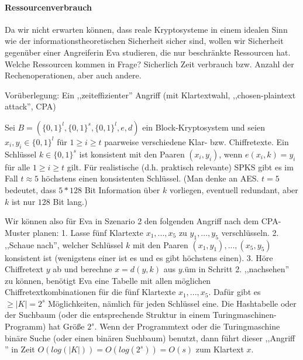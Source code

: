 \documentclass[a4paper]{article}
\begin{document}
\begin{multicols}{3}
    \paragraph{Ressourcenverbrauch}
    Da wir nicht erwarten können, dass reale Kryptosysteme in einem idealen Sinn wie der informationstheoretischen Sicherheit sicher sind, wollen wir Sicherheit gegenüber einer Angreiferin Eva studieren, die nur beschränkte Ressourcen hat. Welche Ressourcen kommen in Frage? Sicherlich Zeit verbrauch bzw. Anzahl der Rechenoperationen, aber auch andere.

    Vorüberlegung: Ein ,,zeiteffizienter'' Angriff (mit Klartextwahl, ,,chosen-plaintext attack'', CPA)

    Sei $B=(\{0,1\}^l,\{0,1\}^s,\{0,1\}^l,e,d)$ ein Block-Kryptosystem und seien $x_i,y_i\in\{0,1\}^l$ für $1\geq i\geq t$ paarweise verschiedene Klar- bzw. Chiffretexte. Ein Schlüssel $k\in\{0,1\}^s$ ist konsistent mit den Paaren $(x_i,y_i)$, wenn $e(x_i,k)=y_i$ für alle $1\geq i\geq t$ gilt. Für realistische (d.h. praktisch relevante) SPKS gibt es im Fall $t\approx 5$ höchstens einen konsistenten Schlüssel. (Man denke an AES. $t=5$ bedeutet, dass $5*128$ Bit Information über $k$ vorliegen, eventuell redundant, aber $k$ ist nur $128$ Bit lang.)

    Wir können also für Eva in Szenario 2 den folgenden Angriff nach dem CPA-Muster planen:
    1. Lasse fünf Klartexte $x_1,...,x_5$ zu $y_1,...,y_5$ verschlüsseln.
    2. ,,Schaue nach'', welcher Schlüssel $k$ mit den Paaren $(x_1,y_1),...,(x_5,y_5)$ konsistent ist (wenigstens einer ist es und es gibt höchstens einen).
    3. Höre Chiffretext $y$ ab und berechne $x=d(y,k)$ aus $y$.üm in Schritt 2. ,,nachsehen'' zu können, benötigt Eva eine Tabelle mit allen möglichen Chiffretextkombinationen für die fünf Klartexte $x_1,...,x_5$. Dafür gibt es $\geq |K|= 2^s$ Möglichkeiten, nämlich für jeden Schlüssel eine. Die Hashtabelle oder der Suchbaum (oder die entsprechende Struktur in einem Turingmaschinen-Programm) hat Größe $2^s$. Wenn der Programmtext oder die Turingmaschine binäre Suche (oder einen binären Suchbaum) benutzt, dann führt dieser ,,Angriff '' in Zeit $O(log(|K|)) =O(log(2^s)) =O(s)$ zum Klartext $x$.


\end{multicols}
\end{document}
